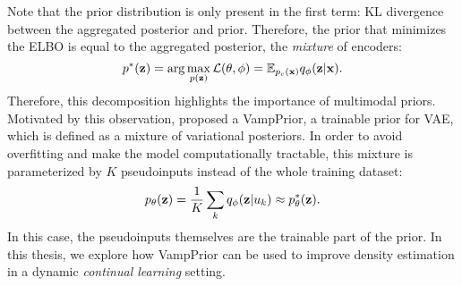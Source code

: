 Note that the prior distribution is only present in the first term: KL divergence between the aggregated posterior and prior. Therefore, the prior that minimizes the ELBO is equal to the aggregated posterior, the \textit{mixture} of encoders:
\begin{equation}
    p^*({\mathbf{z}}) = \arg\max_{p({\mathbf{z}})}\mathcal{L}(\theta, \phi) = \mathbb{E}_{p_e({\mathbf{x}})}q_{\phi}({\mathbf{z}}|{\mathbf{x}}).
\end{equation}
Therefore, this decomposition highlights the importance of multimodal priors. 
Motivated by this observation, \citet{tomczak2018vae} proposed a VampPrior, a trainable prior for VAE, which is defined as a mixture of variational posteriors. In order to avoid overfitting and make the model computationally tractable, this mixture is parameterized by $K$ pseudoinputs instead of the whole training dataset:
\begin{equation}
    p_{\theta}({\mathbf{z}}) = \frac1K \sum_k q_{\phi}({\mathbf{z}}|u_k) \approx p_{\theta}^*({\mathbf{z}}).
\end{equation}
In this case, the pseudoinputs themselves are the trainable part of the prior. In this thesis, we explore how VampPrior can be used to improve density estimation in a dynamic \textit{continual learning} setting. 


